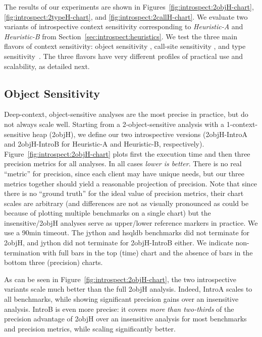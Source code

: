 The results of our experiments are shown in Figures~\ref{fig:introspect:2objH-chart}, \ref{fig:introspect:2typeH-chart}, and \ref{fig:introspect:2callH-chart}. We evaluate two variants of introspective context sensitivity corresponding to \emph{Heuristic-A} and \emph{Heuristic-B} from Section~\ref{sec:introspect:heuristics}. We test the three main flavors of context sensitivity: object sensitivity \cite{issta:2002:Milanova,article:2005:Milanova}, call-site sensitivity \cite{col:1981:Sharir,thesis:Shivers}, and type sensitivity~\cite{popl:2011:Smaragdakis}. The three flavors have very different profiles of practical use and scalability, as detailed next.


\subsection{Object Sensitivity}
Deep-context, object-sensitive analyses are the most precise in practice, but do not always scale well. Starting from a 2-object-sensitive analysis with a 1-context-sensitive heap (2objH), we define our two introspective versions (2objH-IntroA and 2objH-IntroB for Heuristic-A and Heuristic-B, respectively). Figure~\ref{fig:introspect:2objH-chart} plots first the execution time and then three precision metrics for all analyses. In all cases \emph{lower is better}. There is no real ``metric'' for precision, since each client may have unique needs, but our three metrics together should yield a reasonable projection of precision. Note that since there is no ``ground truth'' for the ideal value of precision metrics, their chart scales are arbitrary (and differences are not as visually pronounced as could be because of plotting multiple benchmarks on a single chart) but the insensitive/2objH analyses serve as upper/lower reference markers in practice. We use a 90min timeout. The jython and hsqldb benchmarks did not terminate for 2objH, and jython did not terminate for 2objH-IntroB either. We indicate non-termination with full bars in the top (time) chart and the absence of bars in the bottom three (precision) charts.

As can be seen in Figure~\ref{fig:introspect:2objH-chart}, the two introspective variants scale much better than the full 2objH analysis. Indeed, IntroA scales to all benchmarks, while showing significant precision gains over an insensitive analysis. IntroB is even more precise: it covers \emph{more than two-thirds} of the precision advantage of 2objH over an insensitive analysis for most benchmarks and precision metrics, while scaling significantly better.


